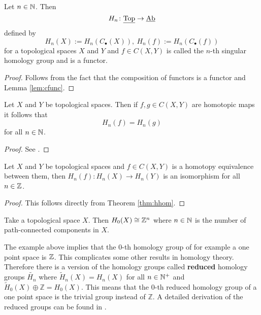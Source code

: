 \begin{thm}\label{thm:hfunc}
  Let $n \in \mathbb{N}$. Then \[H_n\colon \underline{\rm Top} \to \underline{\rm Ab} \]
  defined by \[H_n(X) := H_n(C_\bullet(X)), \: H_n(f) := H_n(C_\bullet(f))\]
  for a topological spaces $X$ and $Y$ and $f \in C(X, Y)$ is called the $n$-th singular homology group and  is a functor. 
\end{thm}

\begin{proof}
  Follows from the fact that the composition of functors is a functor and Lemma \ref{lem:cfunc}.
\end{proof}

\begin{thm}\label{thm:hhom}
  Let $X$ and $Y$ be topological spaces. Then if $f, g\in C(X, Y)$ are homotopic maps it follows that \[H_n(f) = H_n(g)\] for all $n \in \mathbb{N}$.
\end{thm}

\begin{proof}
  See \cite[p. 112f]{hatcher}.
\end{proof}

\begin{col}
  Let $X$ and $Y$ be topological spaces and $f \in C(X, Y)$ is a homotopy equivalence between them, then $H_n(f)\colon H_n(X) \to H_n(Y)$ is an isomorphism for all $n \in \mathbb{Z}$.
\end{col}

\begin{proof}
  This follows directly from Theorem \ref{thm:hhom}.
\end{proof}

\begin{ex}
  Take a topological space $X$. Then $H_0(X) \cong \mathbb{Z}^n$ where $n \in \mathbb{N}$ is the number of path-connected components in $X$. 
\end{ex}

The example above implies that the $0$-th homology group of for example a one point space is $\mathbb{Z}$. This complicates some other results in homology theory. Therefore there is a version of the homology groups called \textbf{reduced} homology groups $\tilde{H_n}$ where $\tilde{H}_n(X) = H_n(X)$ for all $n \in\mathbb{N}^+$ and $\tilde{H}_0(X) \oplus \mathbb{Z} = H_0(X)$. This means that the $0$-th reduced homology group of a one point space is the trivial group instead of $\mathbb{Z}$.
A detailed derivation of the reduced groups can be found in \cite[p. 110]{hatcher}.

